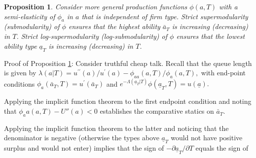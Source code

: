 \documentclass[12pt]{article}
\newtheorem{prop}{Proposition}
\begin{document}
\begin{prop}
\label{extension} Consider more general production functions $\phi (a,T)$ with a semi-elasticity of $\phi_a$ in $a$ that is independent of firm type. Strict supermodularity (submodularity) of $\phi$ ensures that the highest ability $\bar{a}_T$ is increasing (decreasing) in $T$. Strict log-supermodularity (log-submodularity) of $\phi $ ensures that the
lowest ability type $\underline{a}_T$ is increasing (decreasing) in $T$.
\end{prop}

\noindent Proof of Proposition \ref{extension}: Consider truthful cheap talk. Recall that the queue length is given by $\lambda(a|T)=u^{\prime
\prime }(a)/u^{\prime }(a)-\phi _{aa}(a,T)/\phi _{a}(a,T),$ with
end-point conditions $\phi _{a}(\bar{a}_T,T)=u^{\prime }(\bar{a}_{T})$ and $%
e^{-\Lambda (\underline{a}_{T}|T)}\phi(\underline{a}_T,T)=u(\underline{a}%
).$ 

Applying the implicit function theorem to the first endpoint condition and noting that $\phi_aa(a,T)-U''(a)<0$ establishes the comparative statics on $\bar{a}_T$.


Applying the implicit function theorem to the latter and noticing that the denominator is negative (otherwise the types above $\underline{a}_T$ would not have positive surplus and would not enter) implies that the sign of $- \partial \underline{a}_T/\partial T$ equals the sign of
\end{document}
